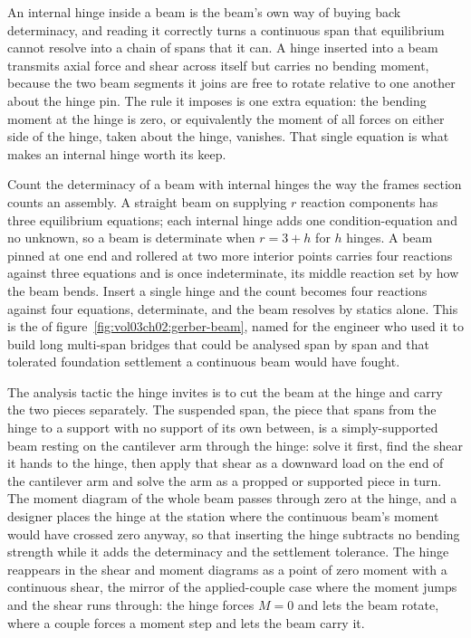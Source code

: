 An internal hinge inside a beam is the beam's own way of buying back
determinacy, and reading it correctly turns a continuous span that
equilibrium cannot resolve into a chain of spans that it can. A hinge
inserted into a beam transmits axial force and shear across itself but
carries no bending moment, because the two beam segments it joins are free
to rotate relative to one another about the hinge pin. The rule it imposes
is one extra equation: the bending moment at the hinge is zero, or
equivalently the moment of all forces on either side of the hinge, taken
about the hinge, vanishes. That single equation is what makes an internal
hinge worth its keep.

Count the determinacy of a beam with internal hinges the way the frames
section counts an assembly. A straight beam on supplying $r$ reaction
components has three equilibrium equations; each internal hinge adds one
condition-equation and no unknown, so a beam is determinate when
$r = 3 + h$ for $h$ hinges. A beam pinned at one end and rollered at two
more interior points carries four reactions against three equations and is
once indeterminate, its middle reaction set by how the beam bends. Insert a
single hinge and the count becomes four reactions against four equations,
determinate, and the beam resolves by statics alone. This is the
 of figure~\ref{fig:vol03ch02:gerber-beam}, named for
the engineer who used it to build long multi-span bridges that could be
analysed span by span and that tolerated foundation settlement a continuous
beam would have fought.



The analysis tactic the hinge invites is to cut the beam at the hinge and
carry the two pieces separately. The suspended span, the piece that spans
from the hinge to a support with no support of its own between, is a
simply-supported beam resting on the cantilever arm through the hinge:
solve it first, find the shear it hands to the hinge, then apply that shear
as a downward load on the end of the cantilever arm and solve the arm as a
propped or supported piece in turn. The moment diagram of the whole beam
passes through zero at the hinge, and a designer places the hinge at the
station where the continuous beam's moment would have crossed zero anyway,
so that inserting the hinge subtracts no bending strength while it adds the
determinacy and the settlement tolerance. The hinge reappears in the shear
and moment diagrams as a point of zero moment with a continuous shear, the
mirror of the applied-couple case where the moment jumps and the shear runs
through: the hinge forces $M = 0$ and lets the beam rotate, where a couple
forces a moment step and lets the beam carry it.

